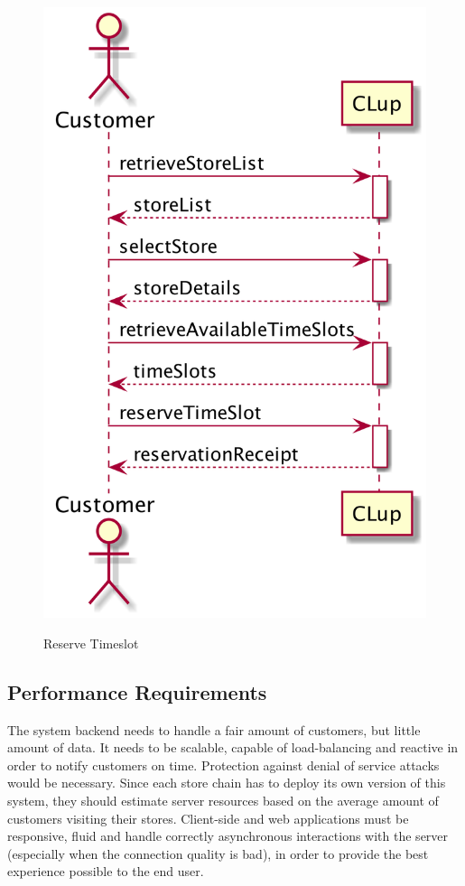 \begin{figure}[H]
\begin{minipage}[b]{0.4\textwidth}
      \includegraphics[width=\textwidth]{uml/reserve_timeslot.png}
      \label{fig:seqdiag-reserve-timeslot}
      \caption{Reserve Timeslot}
    \end{minipage}
\end{figure}




\subsection{Performance Requirements}
The system backend needs to handle a fair amount of customers, but little amount of data. It needs to be scalable, capable of load-balancing and reactive in order to notify customers on time. Protection against denial of service attacks would be necessary.
Since each store chain has to deploy its own version of this system, they should estimate server resources based on the average amount of customers visiting their stores.
Client-side and web applications must be responsive, fluid and handle correctly asynchronous interactions with the server (especially when the connection quality is bad), in order to provide the best experience possible to the end user.



